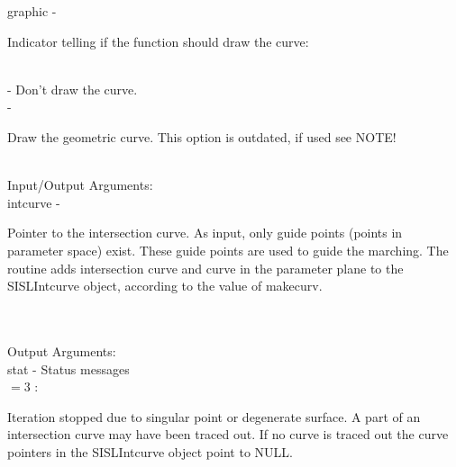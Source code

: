         \>\>    {\fov graphic}\> - \>   \begin{minipg2}
                                Indicator telling if the function
                                should draw the curve:
                                \end{minipg2}\\
                \>\>\>\> -     \>Don't draw the curve.\\
                \>\>\>\> -     \>\begin{minipg5}
                                        Draw the geometric curve. This option is
                                        outdated, if used see NOTE!
                                        \end{minipg5} \\[0.8ex]
\newpagetabs
        \>Input/Output Arguments:\\
        \>\>    {\fov intcurve}\> - \>  \begin{minipg2}
                                Pointer to the intersection curve.
                                As input, only
                                guide points (points in parameter space)
                                exist. These guide points
                                are used to guide the marching.
                                The routine adds
                                intersection curve and curve in the parameter
                                plane to the SISLIntcurve object, according to the value
                                of makecurv.
                                \end{minipg2}\\[0.8ex]
\\
        \>Output Arguments:\\
        \>\>    {\fov stat}     \> - \> Status messages\\
                \>\>\>\>\>      $= 3$ : \>      \begin{minipg5}
                                                Iteration stopped due to singular
                                                point or degenerate surface. A part of an
                                                intersection curve may have been
                                                traced out. If no curve is traced out
                                                the curve pointers in the SISLIntcurve
                                                object point to NULL.
                                                \end{minipg5} \\[0.3ex]
